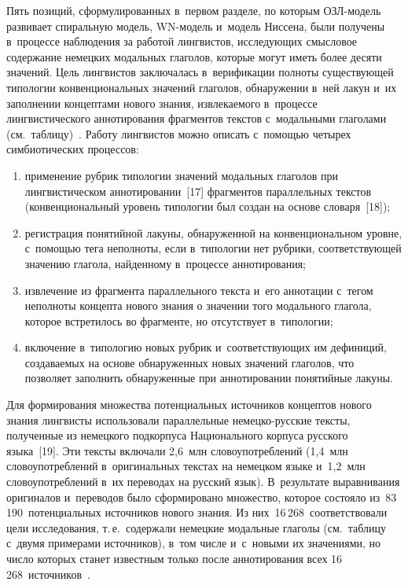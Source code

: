 {\begin{multicols}{2}
  Пять позиций, сформулированных в~первом разделе, по которым 
 ОЗЛ-мо\-дель развивает спиральную модель, WN-мо\-дель и~модель Ниссена, 
были получены в~процессе наблюдения за работой лингвистов, исследующих 
смысловое содержание немецких модальных глаголов, которые могут иметь 
более десяти значений. Цель лингвистов заключалась в~верификации полноты 
существующей типологии конвенциональных значений глаголов, обнаружении в~ней лакун и~их заполнении концептами нового знания, извлекаемого 
в~процессе лингвистического аннотирования фрагментов текстов 
с~модальными глаголами (см.\ таблицу)~\cite{13-zac, 14-zac, 15-zac, 16-zac}. Работу 
лингвистов можно описать с~помощью четырех симбиотических процессов:\\[-15pt]
  \begin{enumerate}[(1)]
\item применение рубрик типологии значений модальных глаголов при 
лингвистическом аннотировании~[17] фрагментов параллельных текс\-тов 
(конвенциональный уровень типологии был создан на основе словаря~[18]);\\[-17pt]
\item регистрация понятийной лакуны, обнаруженной на конвенциональном 
уровне, с~по\-мощью тега неполноты, если в~типологии нет руб\-ри\-ки, 
соответствующей значению глагола, найден\-но\-му в~процессе аннотирования;\\[-17pt]
\item извлечение из фрагмента параллельного текста и~его аннотации с~тегом 
неполноты кон\-цеп\-та нового знания о значении того модального глагола, 
которое встретилось во фрагменте, но отсутствует в~типологии;
\item включение в~типологию новых рубрик и~соответствующих им 
дефиниций, создаваемых на основе обнаруженных новых значений глаголов, 
что позволяет заполнить обнаруженные при аннотировании понятийные 
лакуны.
\end{enumerate}

  Для формирования множества потенциальных источников концептов нового 
знания лингвисты использовали параллельные не\-мец\-ко-рус\-ские текс\-ты, 
полученные из немецкого подкорпуса Национального корпуса русского 
языка~[19]. Эти текс\-ты включали 2,6~млн словоупотреблений (1,4~млн 
словоупотреблений в~оригинальных текстах на немецком языке и~1,2~млн 
словоупотреблений в~их переводах на русский язык). В~результате 
выравнивания оригиналов и~переводов было сформировано множество, которое 
состояло из~83\,190~потенциальных источников нового знания. Из 
них~16\,268~соответствовали цели исследования, т.\,е.\ содержали немецкие 
модальные глаголы (см.\ таблицу с~двумя примерами источников), в~том числе 
и~с~новыми их значениями, но число которых станет известным только после 
аннотирования всех 16\,268~источников~\cite{14-zac, 16-zac}.
  


\end{multicols}}
